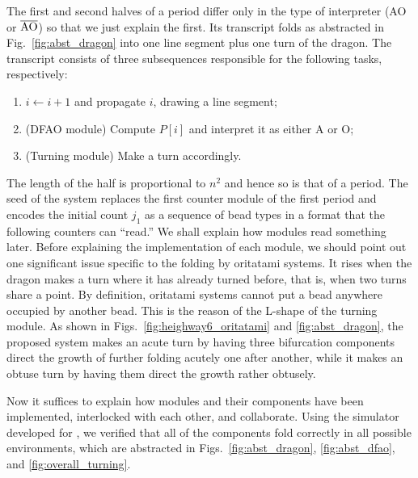 The first and second halves of a period differ only in the type of interpreter (AO or $\overline{\rm AO}$) so that we just explain the first. 
Its transcript folds as abstracted in Fig.~\ref{fig:abst_dragon} into one line segment plus one turn of the dragon. 
The transcript consists of three subsequences responsible for the following tasks, respectively:  
\begin{enumerate}[itemsep=0pt]
\item $i \gets i + 1$ and propagate $i$, drawing a line segment;
\item (DFAO module) Compute $P[i]$ and interpret it as either A or O;
\item (Turning module) Make a turn accordingly.
\end{enumerate}
The length of the half is proportional to $n^2$ and hence so is that of a period. 
The seed of the system replaces the first counter module of the first period and encodes the initial count $j_1$ as a sequence of bead types in a format that the following counters can ``read.'' 
We shall explain how modules read something later. 
Before explaining the implementation of each module, we should point out one significant issue specific to the folding by oritatami systems. 
It rises when the dragon makes a turn where it has already turned before, that is, when two turns share a point. 
By definition, oritatami systems cannot put a bead anywhere occupied by another bead. 
This is the reason of the L-shape of the turning module. 
As shown in Figs.~\ref{fig:heighway6_oritatami} and \ref{fig:abst_dragon}, the proposed system makes an acute turn by having three bifurcation components direct the growth of further folding acutely one after another, while it makes an obtuse turn by having them direct the growth rather obtusely. 


Now it suffices to explain how modules and their components have been implemented, interlocked with each other, and collaborate. 
Using the simulator developed for \cite{HaKiOtSe2016}, we verified that all of the components fold correctly in all possible environments, which are abstracted in Figs.~\ref{fig:abst_dragon}, \ref{fig:abst_dfao}, and \ref{fig:overall_turning}. 

